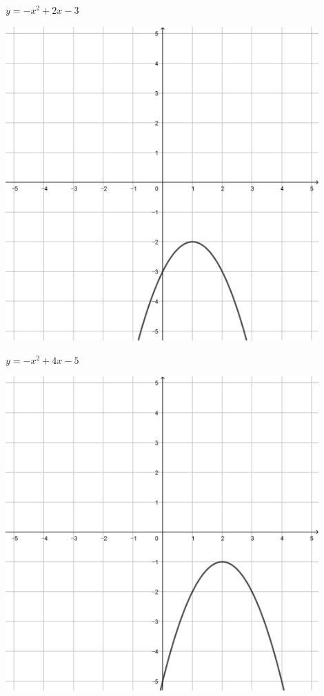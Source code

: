 \documentclass[a4paper]{oblivoir}
\begin{document}
\clearpage
\begin{minipage}{0.45\textwidth}\centering
\(y=-x^2+2x-3\)
\par\bigskip\includegraphics[width=0.9\textwidth]{img/2_quadratic_27}
\end{minipage}
\begin{minipage}{0.45\textwidth}\centering
\(y=-x^2+4x-5\)
\par\bigskip\includegraphics[width=0.9\textwidth]{img/2_quadratic_28}
\end{minipage}\bigskip\bigskip\par
\end{document}
